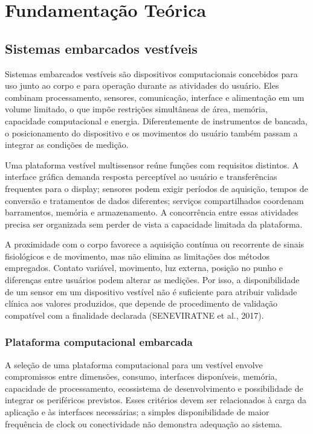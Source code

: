 \documentclass{article}
\begin{document}
\section{Fundamenta\c{c}\~ao Te\'orica}


\subsection{Sistemas embarcados vest\'iveis}


Sistemas embarcados vest\'iveis s\~ao dispositivos computacionais concebidos para uso junto ao corpo e para opera\c{c}\~ao durante as atividades do usu\'ario. Eles combinam processamento, sensores, comunica\c{c}\~ao, interface e alimenta\c{c}\~ao em um volume limitado, o que imp\~oe restri\c{c}\~oes simult\^aneas de \'area, mem\'oria, capacidade computacional e energia. Diferentemente de instrumentos de bancada, o posicionamento do dispositivo e os movimentos do usu\'ario tamb\'em passam a integrar as condi\c{c}\~oes de medi\c{c}\~ao.


Uma plataforma vest\'ivel multissensor re\'une fun\c{c}\~oes com requisitos distintos. A interface gr\'afica demanda resposta percept\'ivel ao usu\'ario e transfer\^encias frequentes para o display; sensores podem exigir per\'iodos de aquisi\c{c}\~ao, tempos de convers\~ao e tratamentos de dados diferentes; servi\c{c}os compartilhados coordenam barramentos, mem\'oria e armazenamento. A concorr\^encia entre essas atividades precisa ser organizada sem perder de vista a capacidade limitada da plataforma.


A proximidade com o corpo favorece a aquisi\c{c}\~ao cont\'inua ou recorrente de sinais fisiol\'ogicos e de movimento, mas n\~ao elimina as limita\c{c}\~oes dos m\'etodos empregados. Contato vari\'avel, movimento, luz externa, posi\c{c}\~ao no punho e diferen\c{c}as entre usu\'arios podem alterar as medi\c{c}\~oes. Por isso, a disponibilidade de um sensor em um dispositivo vest\'ivel n\~ao \'e suficiente para atribuir validade cl\'inica aos valores produzidos, que depende de procedimento de valida\c{c}\~ao compat\'ivel com a finalidade declarada (SENEVIRATNE et al., 2017).


\subsubsection{Plataforma computacional embarcada}


A sele\c{c}\~ao de uma plataforma computacional para um vest\'ivel envolve compromissos entre dimens\~oes, consumo, interfaces dispon\'iveis, mem\'oria, capacidade de processamento, ecossistema de desenvolvimento e possibilidade de integrar os perif\'ericos previstos. Esses crit\'erios devem ser relacionados \`a carga da aplica\c{c}\~ao e \`as interfaces necess\'arias; a simples disponibilidade de maior frequ\^encia de clock ou conectividade n\~ao demonstra adequa\c{c}\~ao ao sistema.
\end{document}
